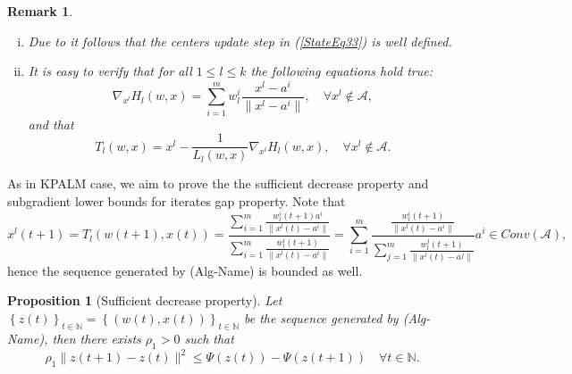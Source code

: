 \documentclass[11pt]{article}
\numberwithin{equation}{section}
\newtheorem{proposition}{Proposition}[section]
\newtheorem{remark}{Remark}
\begin{document}
\begin{remark} 
	\begin{enumerate}[(i)]
	\item Due to  it follows that the centers update step in (\ref{StateEq33}) is well defined.
	\item It is easy to verify that for all $1 \leq l \leq k$ the following equations hold true:
	\begin{equation}
		\nabla_{x^l} H_l(w,x) = \sum\limits_{i=1}^{m} w^i_l \frac{x^l - a^i}{\|x^l - a^i\|} , \quad \forall x^l \notin \mathcal{A}, \label{StateEq35}
	\end{equation}
	and that 
	\begin{equation}
		T_l(w,x) = x^l - \frac{1}{L_l(w,x)}\nabla_{x^l} H_l(w,x), \quad \forall x^l \notin \mathcal{A} . \label{StateEq36}
	\end{equation}
	\end{enumerate}
\end{remark}

As in KPALM case, we aim to prove the the sufficient decrease property and subgradient lower bounds for iterates gap property. Note that
\begin{equation*}
x^l(t+1) = T_l(w(t+1),x(t)) 
= \frac{\sum\limits_{i=1}^{m}\frac{w^i_l(t+1)a^i}{\|x^l(t) - a^i\|}}{\sum\limits_{i=1}^{m}\frac{w^i_l(t+1)}{\|x^l(t) - a^i\|}} 
= \sum\limits_{i=1}^{m}\frac{\frac{w^i_l(t+1)}{\|x^l(t) - a^i\|}}{\sum\limits_{j=1}^{m}\frac{w^j_l(t+1)}{\|x^l(t) - a^j\|}} a^i \in Conv(\mathcal{A}) ,
\end{equation*}
hence the sequence generated by (Alg-Name) is bounded as well.

\begin{proposition}[Sufficient decrease property]
Let $\left\lbrace z(t) \right\rbrace_{t \in \mathbb{N}} = \left\lbrace \left( w(t) , x(t) \right) \right\rbrace_{t \in \mathbb{N}}$ be the sequence generated by (Alg-Name), then there exists $\rho_1 > 0$ such that 
\begin{equation*}
	\rho_1 \|z(t+1) - z(t)\|^2 \leq \Psi(z(t)) - \Psi(z(t+1)) \quad \forall t \in \mathbb{N} .
\end{equation*}
\end{proposition}
\end{document}
